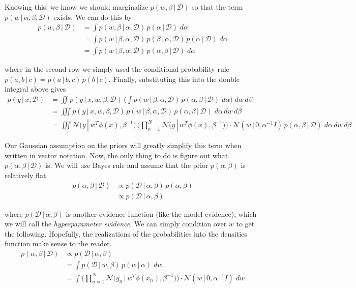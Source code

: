 \documentclass{article}
\begin{document}
    Knowing this, we know we should marginalize $p(w, \beta\,|\,\mathcal{D})$ so that the term $p(w\,|\, \alpha, \beta, \mathcal{D})$ exists. We can do this by
    \begin{align*}
      p(w, \beta\,|\,\mathcal{D}) & = \int p(w, \beta\,|\,\alpha, \mathcal{D}) \, p(\alpha\,|\,\mathcal{D})\; d\alpha \\
      & = \int p(w\,|\,\beta, \alpha, \mathcal{D}) \, p(\beta \,|\, \alpha, \mathcal{D}) \, p(\alpha\,|\,\mathcal{D}) \; d\alpha \\
      & = \int p(w\,|\, \beta, \alpha, \mathcal{D}) \, p(\alpha, \beta\,|\,\mathcal{D}) \; d\alpha
    \end{align*}

    where in the second row we simply used the conditional probability rule $p(a, b\,|\,c) = p(a\,|\,b, c)\, p(b\,|\,c)$. Finally, substituting this into the double integral above gives
    \begin{align*}
      p(y\,|\,x, \mathcal{D}) & = \iint p(y\,|\,x, w, \beta, \mathcal{D}) \, \bigg( \int p(w\,|\, \beta, \alpha, \mathcal{D}) \, p(\alpha, \beta\,|\,\mathcal{D}) \; d\alpha\bigg) \; dw\, d\beta \\
      & = \iiint p(y\,|\,x, w, \beta, \mathcal{D}) \, p(w\,|\, \beta, \alpha, \mathcal{D}) \, p(\alpha, \beta\,|\,\mathcal{D}) \; d\alpha \,dw\, d\beta \\
      & = \iiint \mathcal{N}\big(y\,|\, w^T \phi(x), \beta^{-1}\big)\,\bigg( \prod_{n=1}^N \mathcal{N}\big( y\,|\, w^T \phi(x), \beta^{-1} \big) \bigg) \cdot \mathcal{N}(w\,|\,0, \alpha^{-1} I)\, p(\alpha, \beta\,|\,\mathcal{D}) \; d\alpha \, dw \, d\beta
    \end{align*}



    Our Gaussian assumption on the priors will greatly simplify this term when written in vector notation. Now, the only thing to do is figure out what $p(\alpha, \beta\,|\,\mathcal{D})$ is. We will use Bayes rule and assume that the prior $p(\alpha, \beta)$ is relatively flat.
    \begin{align*}
      p(\alpha, \beta \,|\,\mathcal{D}) & \propto p( \mathcal{D}\,|\,\alpha, \beta) \, p(\alpha, \beta) \\
      & \propto p(\mathcal{D}\,|\,\alpha, \beta)
    \end{align*}

    where $p(\mathcal{D}\,|\,\alpha, \beta)$ is another evidence function (like the model evidence), which we will call the \textit{hyperparameter evidence}. We can simply condition over $w$ to get the following. Hopefully, the realizations of the probabilities into the densities function make sense to the reader.
    \begin{align*}
      p(\alpha, \beta \,|\, \mathcal{D}) & \propto p(\mathcal{D}\,|\,\alpha, \beta) \\
      & = \int p(\mathcal{D}\,|\,w, \beta) \, p(w \,|\,\alpha)\; dw \\
      & = \int \bigg(\prod_{n=1}^N \mathcal{N} \big(y_n \,|\, w^T \phi(x_n), \beta^{-1} \big)\bigg) \cdot \mathcal{N}(w\,|\, 0, \alpha^{-1} I)\; dw
    \end{align*}
\end{document}
